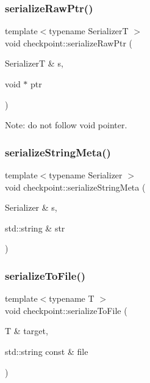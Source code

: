\mbox{\label{namespacecheckpoint_aaadeb0ab61d069afc8a97ec6b6dc630c}} 
\subsubsection{\texorpdfstring{serialize\+Raw\+Ptr()}{serializeRawPtr()}\hspace{0.1cm}{\footnotesize\ttfamily [2/2]}}
{\footnotesize\ttfamily template$<$typename SerializerT $>$ \\
void checkpoint\+::serialize\+Raw\+Ptr (\begin{DoxyParamCaption}\item[{SerializerT \&}]{s,  }\item[{void $\ast$}]{ptr }\end{DoxyParamCaption})}

Note\+: do not follow void pointer. \mbox{\label{namespacecheckpoint_a1ea8e1ef9d0a10d26df77cb5309435aa}} 
\subsubsection{\texorpdfstring{serialize\+String\+Meta()}{serializeStringMeta()}}
{\footnotesize\ttfamily template$<$typename Serializer $>$ \\
void checkpoint\+::serialize\+String\+Meta (\begin{DoxyParamCaption}\item[{Serializer \&}]{s,  }\item[{std\+::string \&}]{str }\end{DoxyParamCaption})}

\mbox{\label{namespacecheckpoint_a3d4326982e3c3feeb933e985758eea82}} 
\subsubsection{\texorpdfstring{serialize\+To\+File()}{serializeToFile()}}
{\footnotesize\ttfamily template$<$typename T $>$ \\
void checkpoint\+::serialize\+To\+File (\begin{DoxyParamCaption}\item[{T \&}]{target,  }\item[{std\+::string const \&}]{file }\end{DoxyParamCaption})}



